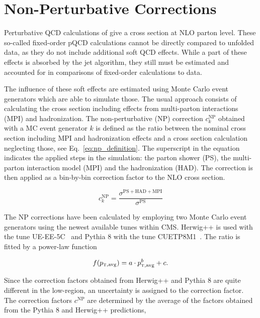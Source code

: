 \section{Non-Perturbative Corrections}
\label{sec:np_factors}

Perturbative QCD calculations of \NLOJETPP give a cross section at NLO
parton level. These so-called fixed-order pQCD calculations cannot be directly
compared to unfolded data, as they do not include additional soft QCD
effects. While a part of these effects is absorbed by the jet algorithm,
they still must be estimated and accounted for in comparisons of fixed-order
calculations to data.

The influence of these soft effects are estimated using Monte Carlo event
generators which are able to simulate those. The usual approach consists of
calculating the cross section including effects from multi-parton interactions
(MPI) and hadronization. The non-perturbative (NP) correction $c_k^\mathrm{NP}$
obtained with a MC event generator $k$ is defined as the ratio between the
nominal cross section including MPI and hadronization effects and a cross section calculation
neglecting those, see Eq.~\ref{eq:np_definition}. The superscript in the
equation indicates the applied steps in the simulation: the parton shower (PS),
the multi-parton interaction model (MPI) and the hadronization (HAD). The
correction is then applied as a bin-by-bin correction factor to the NLO cross
section.

\begin{equation*}
    c_{k}^{\mathrm{NP}} = \frac{\sigma^{\mathrm{PS+HAD+MPI}}}{\sigma^{\mathrm{PS}}}
    \label{eq:np_definition}
\end{equation*}

The NP corrections have been calculated by employing two Monte Carlo event
generators using the newest available tunes within CMS. Herwig++ is used with
the tune UE-EE-5C~\cite{Seymour:2013qka} and Pythia 8 with the tune
CUETP8M1~\cite{Khachatryan:2015pea}. The ratio is fitted by a power-law function

\begin{equation*}
  f(\ptavg) = a \cdot \ptavg^b + c.
  \label{fcn:np_fit}
\end{equation*}

Since the correction factors obtained from Herwig++ and Pythia 8 are quite
different in the low-\pt region, an uncertainty is assigned to the correction
factor. The correction factors $c^\mathrm{NP}$ are determined by the average of the factors
obtained from the Pythia 8 and Herwig++ predictions,

